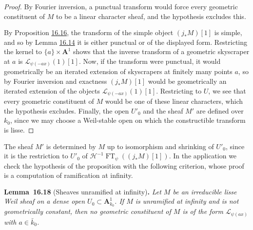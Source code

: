 \documentclass[11pt]{article}
\newenvironment{bpstatement}[2]{\par\addvspace{0.6\baselineskip}\noindent\textbf{#1}#2\textbf{.}\enspace\ignorespaces}
  {\par\addvspace{0.4\baselineskip}}
\newenvironment{bpstatementit}[2]{\begin{bpstatement}{#1}{#2}\itshape\ignorespaces}{\end{bpstatement}}
\begin{document}
\begin{proof}[{Proof}]\label{bp219}%
By Fourier inversion, a punctual transform would force every geometric constituent of \(M\) to be a linear character sheaf, and the hypothesis excludes this.

By Proposition \hyperref[bp214]{16.16}, the transform of the simple object \((j_*M)[1]\) is simple, and so by Lemma \hyperref[bp209]{16.14} it is either punctual or of the displayed form. Restricting the kernel to \(\{a\}\times\mathbf A^1\) shows that the inverse transform of a geometric skyscraper at \(a\) is \(\mathcal L_{\psi(-ax)}(1)[1]\). Now, if the transform were punctual, it would geometrically be an iterated extension of skyscrapers at finitely many points \(a\), so by Fourier inversion and exactness \((j_*M)[1]\) would be geometrically an iterated extension of the objects \(\mathcal L_{\psi(-ax)}(1)[1]\). Restricting to \(U\), we see that every geometric constituent of \(M\) would be one of these linear characters, which the hypothesis excludes. Finally, the open \(U'_0\) and the sheaf \(M'\) are defined over \(k_0\), since we may choose a Weil-stable open on which the constructible transform is lisse.
\end{proof}

\label{bp220}%
The sheaf \(M'\) is determined by \(M\) up to isomorphism and shrinking of \(U'_0\), since it is the restriction to \(U'_0\) of \(\mathcal H^{-1}\operatorname{FT}_\psi((j_*M)[1])\). In the application we check the hypothesis of the proposition with the following criterion, whose proof is a computation of ramification at infinity.

\label{bp221}%
\begin{bpstatementit}{Lemma~16.18}{ (Sheaves unramified at infinity)}
Let \(M\) be an irreducible lisse Weil sheaf on a dense open \(U_0\subset\mathbf A^1_{k_0}\). If \(M\) is unramified at infinity and is not geometrically constant, then no geometric constituent of \(M\) is of the form \(\mathcal L_{\psi(ax)}\) with \(a\in\bar k_0\).
\end{bpstatementit}
\end{document}
